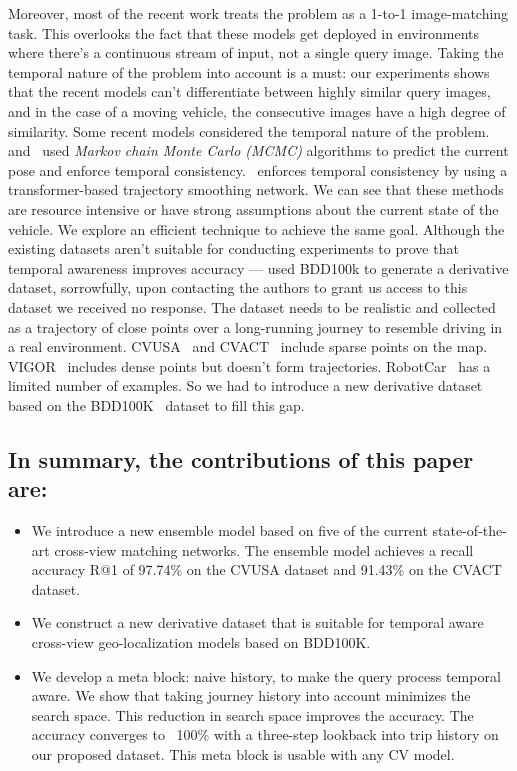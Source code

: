 \documentclass[10pt,letterpaper]{article}
\begin{document}
Moreover, most of the recent work treats the problem as a 1-to-1 image-matching task. This overlooks the fact that these models get deployed in environments where there's a continuous stream of input, not a single query image. Taking the temporal nature of the problem into account is a must:  our experiments shows that the recent models can't differentiate between highly similar query images, and in the case of a moving vehicle, the consecutive images have a high degree of similarity. Some recent models considered the temporal nature of the problem.~\cite{bib7}  and~\cite{bib20,bib21,bib22} used \emph{Markov chain Monte Carlo (MCMC)} algorithms to predict the current pose and enforce temporal consistency.~\cite{bib24} enforces temporal consistency by using a transformer-based trajectory smoothing network. We can see that these methods are resource intensive or have strong assumptions about the current state of the vehicle. We explore an efficient technique to achieve the same goal.
Although the existing datasets aren't suitable for conducting experiments to prove that temporal awareness improves accuracy  — \cite{bib24} used BDD100k to generate a derivative dataset, sorrowfully, upon contacting the authors to grant us access to this dataset we received no response. The dataset needs to be realistic and collected as a trajectory of close points over a long-running journey to resemble driving in a real environment.  CVUSA~\cite{bib55} and CVACT~\cite{bib4} include sparse points on the map. VIGOR~\cite{bib5} includes dense points but doesn't form trajectories. RobotCar~\cite{bib6} has a limited number of examples. So we had to introduce a new derivative dataset based on the BDD100K~\cite{bib12} dataset to fill this gap.

\subsection*{In summary, the contributions of this paper are:}
\begin{itemize}
    \item We introduce a new ensemble model based on five of the current state-of-the-art  cross-view matching networks. The ensemble model achieves a recall accuracy R@1 of 97.74\% on the CVUSA dataset and 91.43\% on the CVACT dataset.
    \item We construct a new derivative dataset that is suitable for temporal aware cross-view geo-localization models based on BDD100K.
    \item We develop a meta block: naive history, to make the query process temporal aware. We show that taking journey history into account minimizes the search space. This reduction in search space improves the accuracy.  The accuracy converges to ~100\% with a three-step lookback into trip history on our proposed dataset. This meta block is usable with any CV model.
\end{itemize}
\end{document}
